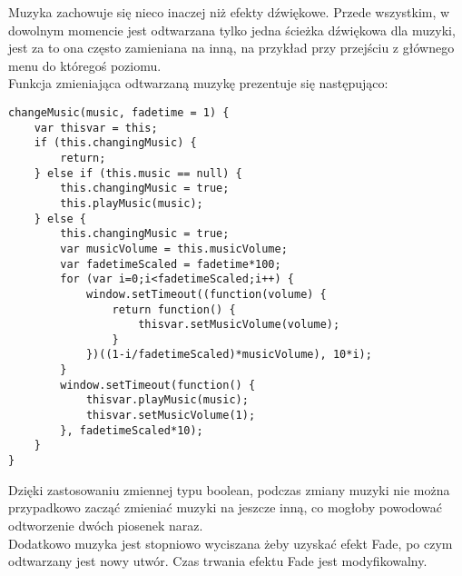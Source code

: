 \newpage
{}\smallskip

Muzyka zachowuje się nieco inaczej niż efekty dźwiękowe. Przede wszystkim, w dowolnym momencie jest odtwarzana tylko jedna \'scieżka dźwiękowa dla muzyki, jest za to ona często zamieniana na inną, na przykład przy przej\'sciu z głównego menu do którego\'s poziomu.\\
Funkcja zmieniająca odtwarzaną muzykę prezentuje się następująco:
\begin{lstlisting}
changeMusic(music, fadetime = 1) {
	var thisvar = this;
	if (this.changingMusic) {
		return;
	} else if (this.music == null) {
		this.changingMusic = true;
		this.playMusic(music);
	} else {
		this.changingMusic = true;
		var musicVolume = this.musicVolume;
		var fadetimeScaled = fadetime*100;
		for (var i=0;i<fadetimeScaled;i++) {
			window.setTimeout((function(volume) {
				return function() {
					thisvar.setMusicVolume(volume);
				}
			})((1-i/fadetimeScaled)*musicVolume), 10*i);
		}
		window.setTimeout(function() {
			thisvar.playMusic(music);
			thisvar.setMusicVolume(1);
		}, fadetimeScaled*10);
	}
}
\end{lstlisting}
Dzięki zastosowaniu zmiennej typu boolean, podczas zmiany muzyki nie można przypadkowo zacząć zmieniać muzyki na jeszcze inną, co mogłoby powodować odtworzenie dwóch piosenek naraz.\\
Dodatkowo muzyka jest stopniowo wyciszana żeby uzyskać efekt Fade, po czym odtwarzany jest nowy utwór. Czas trwania efektu Fade jest modyfikowalny.
\cleardoublepage